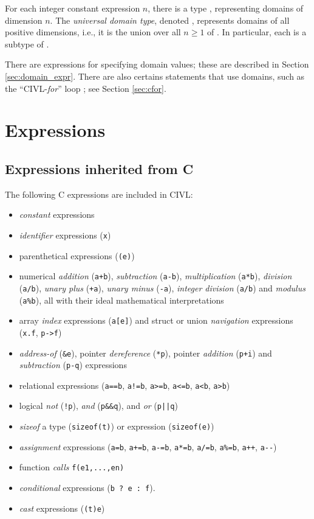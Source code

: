 For each integer constant expression $n$, there is a type
, representing domains of dimension $n$.
The \emph{universal domain type}, denoted \cdomain{}, represents
domains of all positive dimensions, i.e., it is the union over all
$n\geq 1$ of .  In particular, each 
is a subtype of \cdomain{}.

There are expressions for specifying domain values; these are
described in Section \ref{sec:domain_expr}.  There are also certains
statements that use domains, such as the ``CIVL-\emph{for}'' loop
\cfor; see Section \ref{sec:cfor}.


\section{Expressions}

\subsection{Expressions inherited from C}

The following C expressions are included in CIVL: 
\begin{itemize}
\item \emph{constant} expressions
\item \emph{identifier} expressions (\texttt{x})
\item parenthetical expressions (\verb!(e)!)
\item numerical \emph{addition} (\verb!a+b!), \emph{subtraction} (\verb!a-b!),
  \emph{multiplication} (\verb!a*b!), \emph{division} (\verb!a/b!),
  \emph{unary plus} (\verb!+a!), \emph{unary minus} (\verb!-a!),
  \emph{integer division} (\verb!a/b!) and \emph{modulus} (\verb!a%b!),
  all with their ideal mathematical interpretations
\item array \emph{index} expressions (\verb!a[e]!) and struct or union
  \emph{navigation} expressions (\verb!x.f!, \verb!p->f!)
\item \emph{address-of} (\verb!&e!), pointer \emph{dereference} (\verb!*p!),
  pointer \emph{addition} (\verb!p+i!) and \emph{subtraction} (\verb!p-q!)
  expressions
\item relational expressions (\verb!a==b!, \verb~a!=b~, \verb!a>=b!,
  \verb!a<=b!, \verb!a<b!, \verb!a>b!)
\item logical \emph{not} (\verb~!p~), \emph{and} (\verb!p&&q!), and
  \emph{or} (\verb!p||q!)
\item \emph{sizeof} a type (\verb!sizeof(t)!) or expression (\verb!sizeof(e)!)
\item \emph{assignment} expressions (\verb!a=b!, \verb!a+=b!, \verb!a-=b!,
  \verb!a*=b!, \verb!a/=b!, \verb!a%=b!, \verb!a++!, \verb!a--!)
\item function \emph{calls} \verb!f(e1,...,en)!
\item \emph{conditional} expressions (\verb!b ? e : f!).
\item \emph{cast} expressions (\verb!(t)e!)
\end{itemize}

